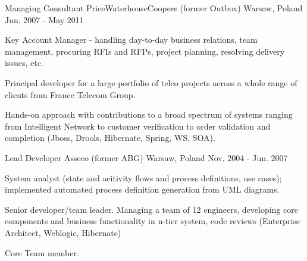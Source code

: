 \begin{cventries}
  \cventry
    {Managing Consultant} %
    {PriceWaterhouseCoopers (former Outbox)} %
    {Warsaw, Poland} %
    {Jun. 2007 - May 2011} %
    {
      \begin{cvitems} %
        \item {Key Account Manager - handling day-to-day business relations, team management, procuring RFIs and RFPs, project planning, resolving delivery issues, etc.}
        \item {Principal developer for a large portfolio of telco projects across a whole range of clients from France Telecom Group.}
        \item {Hands-on approach with contributions to a broad spectrum of systems ranging from Intelligent Network to customer verification to order validation and completion (Jboss, Drools, Hibernate, Spring, WS, SOA).}
      \end{cvitems}
    }

  \cventry
    {Lead Developer} %
    {Asseco (former ABG)} %
    {Warsaw, Poland} %
    {Nov. 2004 - Jun. 2007} %
    {
      \begin{cvitems} %
        \item {System analyst (state and acitivity flows and process definitions, use cases); implemented automated process definition generation from UML diagrams.}
        \item {Senior developer/team leader. Managing a team of 12 engineers, developing core components and business functionality in n-tier system, code reviews (Enterprise Architect, Weblogic, Hibernate)}
        \item {Core Team member.}
      \end{cvitems}
    }

\end{cventries}
